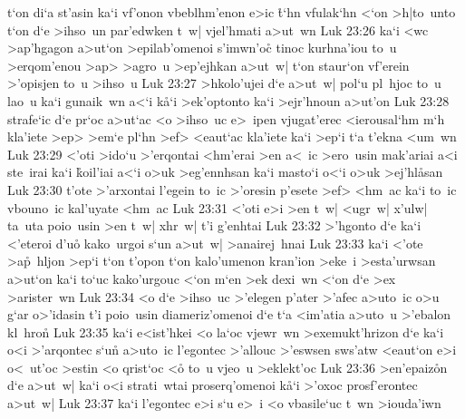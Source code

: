 t`on
di`a
st'asin
ka`i
vf'onon
vbeblhm'enon
e>ic
\r{t}`hn
vfulak`hn
<`on
>h|to~unto
t`on
d`e
>ihso~un
par'edwken
t~w|
vjel'hmati
a>ut~wn\bibvsend
\vs Luk 23:26
ka`i
<wc
>ap'hgagon
a>ut`on
>epilab'omenoi
s'imwn'oc\r{}
tinoc
kurhna'iou
to~u
>erqom'enou
>ap>
>agro~u
>ep'ejhkan
a>ut~w|
t`on
staur`on
vf'erein
>'opisjen
to~u
>ihso~u\bibvsend
\vs Luk 23:27
>hkolo'ujei
d`e
a>ut~w|
pol`u
pl~hjoc
to~u
lao~u
ka`i
gunaik~wn
a<`i
k\r{a}`i
>ek'optonto
ka`i
>ejr'hnoun
a>ut'on\bibvsend
\vs Luk 23:28
strafe`ic
d`e
pr`oc
a>ut`ac
<o
>ihso~uc
e>~ipen
vjugat'erec
<ierousal`hm
m`h
kla'iete
>ep>
>em`e
pl`hn
>ef>
<eaut`ac
kla'iete
ka`i
>ep`i
t`a
t'ekna
<um~wn\bibvsend
\vs Luk 23:29
<'oti
>ido`u
>'erqontai
<hm'erai
>en
a<~ic
>ero~usin
mak'ariai
a<i
ste~irai
ka`i
\r{k}oil'iai
a<`i
o>uk
>eg'ennhsan
ka`i
masto`i
o<`i
o>uk
>ej'hl\r{a}san\bibvsend
{}
\vs Luk 23:30
t'ote
>'arxontai
l'egein
to~ic
>'oresin
p'esete
>ef>
<hm~ac
ka`i
to~ic
vbouno~ic
kal'uyate
<hm~ac\bibvsend
\vs Luk 23:31
<'oti
e>i
>en
t~w|
<ugr~w|
x'ulw|
ta~uta
poio~usin
>en
t~w|
xhr~w|
t'i
g'enhtai\bibvsend
\vs Luk 23:32
>'hgonto
d`e
ka`i
<'eteroi
d'uo\r{}
kako~urgoi
s`un
a>ut~w|
>anairej~hnai\bibvsend
\vs Luk 23:33
ka`i
<'ote
>a\r{p}~hljon
>ep`i
t`on
t'opon
t`on
kalo'umenon
kran'ion
>eke~i
>esta'urwsan
a>ut`on
ka`i
to`uc
kako'urgouc
<`on
m`en
>ek
dexi~wn
<`on
d`e
>ex
>arister~wn\bibvsend
\vs Luk 23:34
<o
d`e
>ihso~uc
>'elegen
p'ater
>'afec
a>uto~ic
o>u
g`ar
o>'idasin
t'i
poio~usin
diameriz'omenoi
d`e
t`a
<im'atia
a>uto~u
>'ebalon
kl~hro\r{n}\bibvsend
{}
\vs Luk 23:35
ka`i
e<ist'hkei
<o
la`oc
vjewr~wn
>exemukt'hrizon
d`e
ka`i
o<i
>'arqontec
s`un\r{}
a>uto~ic
l'egontec
>'allouc
>'eswsen
sws'atw
<eaut`on
e>i
o<~ut'oc
>estin
<o
qrist`oc
<o\r{}
to~u
vjeo~u
>eklekt'oc\bibvsend
\vs Luk 23:36
>en'epaiz\r{o}n
d`e
a>ut~w|
ka`i
o<i
strati~wtai
proserq'omenoi
k\r{a}`i
>'oxoc
prosf'erontec
a>ut~w|\bibvsend
\vs Luk 23:37
ka`i
l'egontec
e>i
s`u
e>~i
<o
vbasile`uc
t~wn
>iouda'iwn
